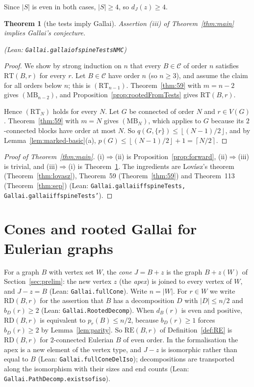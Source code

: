 \documentclass[11pt]{amsart}
\newtheorem{theorem}{Theorem}[section]
\theoremstyle{definition}
\theoremstyle{remark}
\renewcommand{\_}{\oldunderscore\allowbreak}
\newcommand{\lean}[1]{\textup{(Lean: {\small\texttt{#1}})}}
\newcommand{\leanst}[1]{\par{\raggedright\small\textup{(Lean: \texttt{#1})}\par}}
\newcommand{\cC}{\mathcal{C}}
\newcommand{\fl}[1]{\left\lfloor #1\right\rfloor}
\newcommand{\cl}[1]{\left\lceil #1\right\rceil}
\newcommand{\MBU}{\mathrm{MB}}
\newcommand{\RT}{\mathrm{RT}}
\newcommand{\RE}{\mathrm{RE}}
\newcommand{\pr}{p_r}
\begin{document}
Since $|S|$ is even in both cases, $|S|\ge4$, so $d_J(z)\ge4$.

\begin{theorem}[the tests imply Gallai]\label{thm:converse}
Assertion \textup{(iii)} of Theorem~\ref{thm:main} implies Gallai's conjecture.
\leanst{Gallai.gallai\_of\_spineTestsNMC}
\end{theorem}

\begin{proof}
We show by strong induction on $n$ that every $B\in\cC$ of order $n$ satisfies $\RT(B,r)$ for every
$r$. Let $B\in\cC$ have order $n$ (so $n\ge3$), and assume the claim for all orders below $n$; this
is $(\RT_{n-1})$. Theorem~\ref{thm:59} with $m=n-2$ gives $(\MBU_{n-2})$, and
Proposition~\ref{prop:rootedFromTests} gives $\RT(B,r)$.

Hence $(\RT_N)$ holds for every $N$. Let $G$ be connected of order $N$ and $r\in V(G)$.
Theorem~\ref{thm:59} with $m=N$ gives $(\MBU_N)$, which applies to $G$ because its $2$-connected
blocks have order at most $N$. So $q(G,\{r\})\le\fl{(N-1)/2}$, and by
Lemma~\ref{lem:marked-basic}(a), $p(G)\le\fl{(N-1)/2}+1=\cl{N/2}$.
\end{proof}

\begin{proof}[Proof of Theorem~\ref{thm:main}]
(i)$\Rightarrow$(ii) is Proposition~\ref{prop:forward}, (ii)$\Rightarrow$(iii) is trivial, and
(iii)$\Rightarrow$(i) is Theorem~\ref{thm:converse}. The ingredients are Lov\'asz's theorem
(Theorem~\ref{thm:lovasz}), Theorem~59 (Theorem~\ref{thm:59}) and Theorem~113
(Theorem~\ref{thm:sep}) \lean{Gallai.gallai\_iff\_spineTests, Gallai.gallai\_iff\_spineTests'}.
\end{proof}

\section{Cones and rooted Gallai for Eulerian graphs}\label{sec:cones}

For a graph $B$ with vertex set $W$, the \emph{cone} $J=B+z$ is the graph $B+z(W)$ of
Section~\ref{sec:prelim}: the new vertex $z$ (the \emph{apex}) is joined to every vertex of $W$, and
$J-z=B$ \lean{Gallai.fullCone}. Write $n=|W|$. For $r\in W$ we write $\mathrm{RD}(B,r)$ for the
assertion that $B$ has a decomposition $D$ with $|D|\le n/2$ and $b_D(r)\ge2$
\lean{Gallai.RootedDecomp}. When $d_B(r)$ is even and positive, $\mathrm{RD}(B,r)$ is equivalent
to $\pr(B)\le n/2$, because $b_D(r)\ge1$ forces $b_D(r)\ge2$ by Lemma~\ref{lem:parity}. So
$\RE(B,r)$ of Definition~\ref{def:RE} is $\mathrm{RD}(B,r)$ for $2$-connected Eulerian $B$ of even
order. In the formalisation the apex is a new element of the vertex type, and $J-z$ is isomorphic
rather than equal to $B$ \lean{Gallai.fullConeDelIso}; decompositions are transported along the
isomorphism with their sizes and end counts \lean{Gallai.PathDecomp.exists\_of\_iso}.
\end{document}
